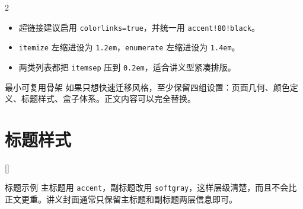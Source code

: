 \documentclass[11pt,a4paper]{ctexart}
\begin{document}
\begin{multicols}{2}
\begin{itemize}
\item 超链接建议启用 \texttt{colorlinks=true}，并统一用 \texttt{accent!80!black}。
\item \texttt{itemize} 左缩进设为 \texttt{1.2em}，\texttt{enumerate} 左缩进设为 \texttt{1.4em}。
\item 两类列表都把 \texttt{itemsep} 压到 \texttt{0.2em}，适合讲义型紧凑排版。
\end{itemize}

\begin{ideabox}{最小可复用骨架}
如果只想快速迁移风格，至少保留四组设置：页面几何、颜色定义、标题样式、盒子体系。正文内容可以完全替换。
\end{ideabox}

\section{标题样式}

\begin{codeblock}
\titleformat{\section}{\large\bfseries\color{accent}}{\thesection}{0.6em}{}[\titlerule]
\titleformat{\subsection}{\normalsize\bfseries\color{accent!90}}{\thesubsection}{0.5em}{}
\titleformat{\subsubsection}{\normalsize\bfseries\color{accent!80}}{\thesubsubsection}{0.5em}{}
\titlespacing*{\section}{0pt}{0.8em}{0.45em}
\titlespacing*{\subsection}{0pt}{0.6em}{0.3em}
\titlespacing*{\subsubsection}{0pt}{0.5em}{0.2em}
\end{codeblock}

\begin{examplebox}{标题示例}
主标题用 \texttt{accent}，副标题改用 \texttt{softgray}，这样层级清楚，而且不会比正文更重。讲义封面通常只保留主标题和副标题两层信息即可。
\end{examplebox}


\end{multicols}
\end{document}
